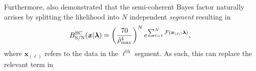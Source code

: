 \documentclass[aps, prd, twocolumn, superscriptaddress, floatfix, showpacs, nofootinbib, longbibliography]{revtex4-1}
\begin{document}
Furthermore, \citet{prix2011} also demonstrated that the semi-coherent Bayes
factor naturally arrises by splitting the likelihood into $N$ independent
\emph{segment} resulting in
\begin{equation}
B_{\rm S/N}^{\textrm{SC}}(\boldsymbol{x}|\boldsymbol{\mathbf{\lambda}}) =
\left(\frac{70}{\hat{\rho}_{\mathrm{max}}^{4}}\right)^{N}
e^{\sum_{\ell=1}^{N}{\mathcal{F}}(\boldsymbol{x}_{(\ell)}; \boldsymbol{\mathbf{\lambda}})},
\label{eqn_SC_CW_likelihood}
\end{equation}
where $\boldsymbol{x}_{(\ell)}$ refers to the data in the $\ell^{\mathrm{th}}$
segment. As such, this can replace the relevant term in



%
%
\end{document}
